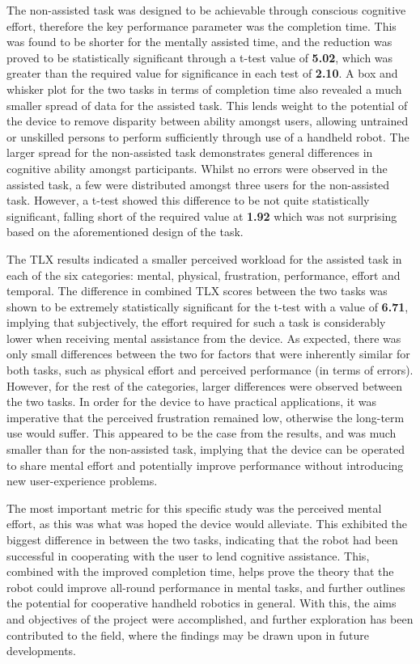 \documentclass[11pt]{article}
\begin{document}
The non-assisted task was designed to be achievable through conscious cognitive effort, therefore the key performance parameter was the completion time. This was found to be shorter for the mentally assisted time, and the reduction was proved to be statistically significant through a t-test value of \textbf{5.02}, which was greater than the required value for significance in each test of \textbf{2.10}. A box and whisker plot for the two tasks in terms of completion time also revealed a much smaller spread of data for the assisted task. This lends weight to the potential of the device to remove disparity between ability amongst users, allowing untrained or unskilled persons to perform sufficiently through use of a handheld robot. The larger spread for the non-assisted task demonstrates general differences in cognitive ability amongst participants. Whilst no errors were observed in the assisted task, a few were distributed amongst three users for the non-assisted task. However, a t-test showed this difference to be not quite statistically significant, falling short of the required value at \textbf{1.92} which was not surprising based on the aforementioned design of the task.

The TLX results indicated a smaller perceived workload for the assisted task in each of the six categories: mental, physical, frustration, performance, effort and temporal. The difference in combined TLX scores between the two tasks was shown to be extremely statistically significant for the t-test with a value of \textbf{6.71}, implying that subjectively, the effort required for such a task is considerably lower when receiving mental assistance from the device. As expected, there was only small differences between the two for factors that were inherently similar for both tasks, such as physical effort and perceived performance (in terms of errors). However, for the rest of the categories, larger differences were observed between the two tasks. In order for the device to have practical applications, it was imperative that the perceived frustration remained low, otherwise the long-term use would suffer. This appeared to be the case from the results, and was much smaller than for the non-assisted task, implying that the device can be operated to share mental effort and potentially improve performance without introducing new user-experience problems.

The most important metric for this specific study was the perceived mental effort, as this was what was hoped the device would alleviate. This exhibited the biggest difference in between the two tasks, indicating that the robot had been successful in cooperating with the user to lend cognitive assistance. This, combined with the improved completion time, helps prove the theory that the robot could improve all-round performance in mental tasks, and further outlines the potential for cooperative handheld robotics in general. With this, the aims and objectives of the project were accomplished, and further exploration has been contributed to the field, where the findings may be drawn upon in future developments. 
\end{document}

